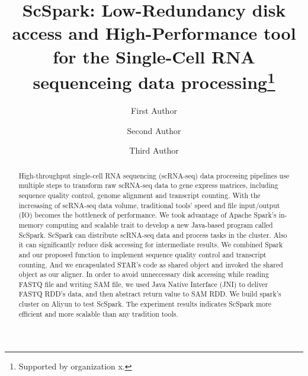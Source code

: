\documentclass[runningheads]{llncs}
\begin{document}
%
\title{ScSpark: Low-Redundancy disk access and High-Performance tool for the Single-Cell RNA sequenceing data processing\thanks{Supported by organization x.}}
%
%
\author{First Author \and
Second Author \and
Third Author}
%
%
%
\maketitle
%
\begin{abstract}
High-throughput single-cell RNA sequencing
  (scRNA-seq) data processing pipelines use multiple steps to transform raw scRNA-seq data to gene express matrices, including sequence quality control, genome alignment and transcript counting.
With the incresasing of scRNA-seq data volume, traditional tools' speed and file input/output (IO) becomes the bottleneck of performance.
We took advantage of Apache Spark's in-memory computing and scalable trait to develop a new Java-based program called ScSpark.
ScSpark can distribute scRNA-seq data and process tasks in the cluster.
Also it can significantly reduce disk accessing for intermediate results.
We combined Spark and our proposed function to implement sequence quality control and transcript counting.
And we encapsulated STAR's code as shared object and invoked the shared object as our aligner.
In order to avoid unneccessary disk accessing while reading FASTQ file and writing SAM file, we used Java Native Interface (JNI) to deliver FASTQ RDD's data, and then abstract return value to SAM RDD.
We build spark's cluster on Aliyun to test ScSpark.
The experiment results indicates ScSpark more efficient and more scalable than any tradition tools.
\end{abstract}
\end{document}
